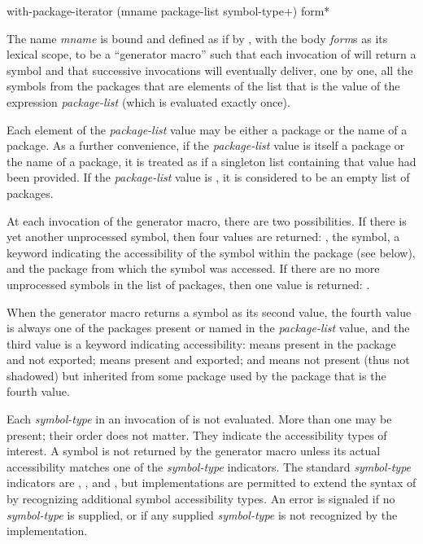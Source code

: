 \begin{defmac}
with-package-iterator (mname package-list {symbol-type}+)
                      {form}*

The name \emph{mname} is bound and defined as if by ,
with the body \emph{form\/}s as its lexical scope, to be a ``generator macro''
such that each invocation of  will
return a symbol and that successive invocations
will eventually deliver, one by one, all the symbols
from the packages that are elements of the list that is the value of the
expression \emph{package-list} (which is evaluated exactly once).

Each element of the \emph{package-list} value
may be either a package or the name of a package.
As a further convenience, if the \emph{package-list} value
is itself a package or the name of a package, it is treated
as if a singleton list containing that value had been provided.
If the \emph{package-list} value is , it is considered
to be an empty list of packages.

At each invocation of the generator macro, there are two possibilities.
If there is yet another unprocessed symbol, then
four values are returned: , the symbol,
a keyword
indicating the accessibility of the symbol within the package (see below), and
the package from which the symbol was accessed.
If there are no more unprocessed symbols in the
list of packages, then one value is returned: .

When the generator macro returns a symbol as its second value, the
fourth value is always one of the packages present or named in the
\emph{package-list} value, and the third value is a keyword indicating
accessibility:
 means present in the package and not exported;
 means present and exported;
and  means not present (thus not shadowed) but inherited
from some package used by the package that is the fourth value.

Each \emph{symbol-type} in an invocation of 
is not evaluated.  More than one may be present; their order does not
matter.  They indicate the accessibility types of interest.
A symbol is not returned by the generator macro unless its actual
accessibility matches one of the \emph{symbol-type} indicators.
The standard \emph{symbol-type} indicators are ,
, and , but implementations are permitted
to extend the syntax of  by recognizing
additional symbol accessibility types.  An error is signaled
if no \emph{symbol-type} is supplied, or if any supplied \emph{symbol-type}
is not recognized by the implementation.


\end{defmac}
